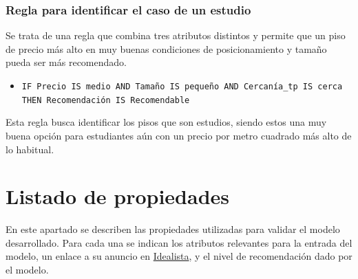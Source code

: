 \documentclass[12pt]{report} %
\begin{document}
    \subsection{Regla para identificar el caso de un estudio}
    Se trata de una regla que combina tres atributos distintos y permite que un piso de precio más 
    alto en muy buenas condiciones de posicionamiento y tamaño pueda ser más recomendado.

    \begin{itemize}
        \item \texttt{IF Precio IS medio AND Tamaño IS pequeño AND Cercanía\_tp IS cerca THEN Recomendación IS Recomendable}
    \end{itemize}

    Esta regla busca identificar los pisos que son estudios, siendo estos una muy buena opción 
    para estudiantes aún con un precio por metro cuadrado más alto de lo habitual. 

    \chapter{Listado de propiedades}
    \label{chap:propiedades}
    En este apartado se describen las propiedades utilizadas para validar el
    modelo desarrollado. Para cada una se indican los atributos relevantes para
    la entrada del modelo, un enlace a su anuncio en
    \href{https://www.idealista.com}{Idealista}, y el nivel de recomendación
    dado por el modelo.
\end{document}
